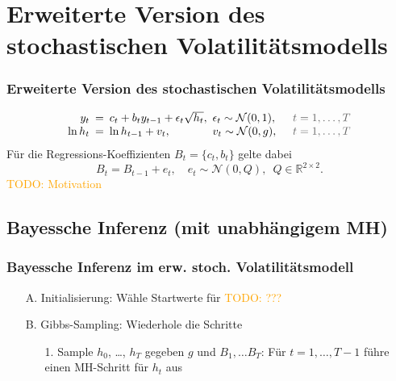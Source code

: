\documentclass[10pt]{beamer}
\theoremstyle{definition}
\newcommand{\R}{\mathbb{R}} %
\newcommand{\Normal}{\mathcal{N}} %
\newcommand{\TODO}[1]{\textcolor{orange}{TODO: #1}}
\newcommand{\typeInfo}[1]{\textcolor{TypeInfoColor}{#1}}
\begin{document}
\section[Erweitertes stoch. Volatilitätsmodell]{Erweiterte Version des stochastischen Volatilitätsmodells}

\begin{frame}
  \frametitle{Erweiterte Version des stochastischen Volatilitätsmodells}
  \[
    \arraycolsep=2.5pt
    \begin{array}{rclll}
      y_t &=& c_t + b_t y_{t-1} + \epsilon_t \sqrt{h_t}, & \epsilon_t \sim \Normal(0, 1), & \quad \typeInfo{t = 1, \ldots, T} \\
      \ln h_t &=& \ln h_{t-1} + v_t, & v_t \sim \Normal(0, g), & \quad \typeInfo{t = 1, \ldots, T}
    \end{array}
  \]
  Für die Regressions-Koeffizienten $B_t = \{ c_t, b_t \}$ gelte dabei
  \[
    B_t = B_{t-1} + e_t, \quad e_t \sim \Normal(0, Q), \enspace Q \in \R^{2 \times 2}.
  \]
  \TODO{Motivation}
\end{frame}

\subsection{Bayessche Inferenz (mit unabhängigem MH)}

\begin{frame}[t]
  \frametitle{Bayessche Inferenz im erw. stoch. Volatilitätsmodell}
  \begin{enumerate}
    \item[A.] Initialisierung: Wähle Startwerte für \TODO{???}
    \item[B.] Gibbs-Sampling: Wiederhole die Schritte
    \begin{enumerate}
      \item[1.] Sample $h_0$, \ldots, $h_T$ gegeben $g$ und $B_1, \ldots B_T$:
      Für $t = 1, \ldots, T-1$ führe einen MH-Schritt für $h_t$ aus
    \end{enumerate}
  \end{enumerate}
\end{frame}
\end{document}
